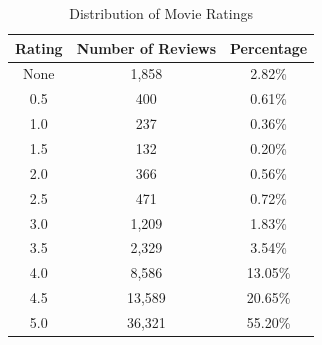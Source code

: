 \documentclass[11pt]{article}
\begin{document}
\renewcommand{\thetable}{2.1.1}
\begin{table}[h]
    	\centering
    	\begin{tabular}{c c c}
        		\toprule
        		\textbf{Rating} & \textbf{Number of Reviews} & \textbf{Percentage} \\
        		\midrule
        		None & 1,858 & 2.82\% \\
        		0.5 & 400 & 0.61\% \\
        		1.0 & 237 & 0.36\% \\
        		1.5 & 132 & 0.20\% \\
        		2.0 & 366 & 0.56\% \\
        		2.5 & 471 & 0.72\% \\
        		3.0 & 1,209 & 1.83\% \\
        		3.5 & 2,329 & 3.54\% \\
        		4.0 & 8,586 & 13.05\% \\
        		4.5 & 13,589 & 20.65\% \\
        		5.0 & 36,321 & 55.20\% \\
        		\bottomrule
    	\end{tabular}
    	\caption{Distribution of Movie Ratings}
    	\label{tab:review_rating_distribution}
\end{table}
\end{document}
